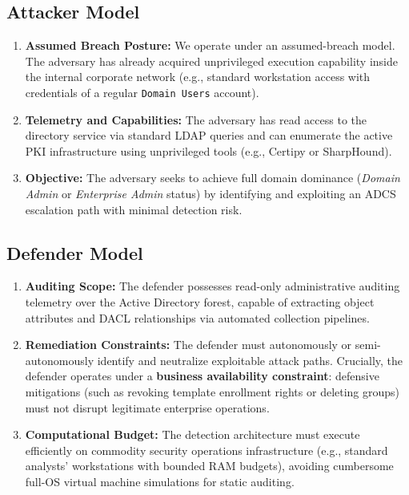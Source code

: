 \subsection{Attacker Model}
\begin{enumerate}
    \item \textbf{Assumed Breach Posture:} We operate under an assumed-breach model. The adversary has already acquired unprivileged execution capability inside the internal corporate network (e.g., standard workstation access with credentials of a regular \texttt{Domain Users} account).
    \item \textbf{Telemetry and Capabilities:} The adversary has read access to the directory service via standard LDAP queries and can enumerate the active PKI infrastructure using unprivileged tools (e.g., Certipy or SharpHound).
    \item \textbf{Objective:} The adversary seeks to achieve full domain dominance (\textit{Domain Admin} or \textit{Enterprise Admin} status) by identifying and exploiting an ADCS escalation path with minimal detection risk.
\end{enumerate}

\subsection{Defender Model}
\begin{enumerate}
    \item \textbf{Auditing Scope:} The defender possesses read-only administrative auditing telemetry over the Active Directory forest, capable of extracting object attributes and DACL relationships via automated collection pipelines.
    \item \textbf{Remediation Constraints:} The defender must autonomously or semi-autonomously identify and neutralize exploitable attack paths. Crucially, the defender operates under a \textbf{business availability constraint}: defensive mitigations (such as revoking template enrollment rights or deleting groups) must not disrupt legitimate enterprise operations.
    \item \textbf{Computational Budget:} The detection architecture must execute efficiently on commodity security operations infrastructure (e.g., standard analysts' workstations with bounded RAM budgets), avoiding cumbersome full-OS virtual machine simulations for static auditing.
\end{enumerate}
